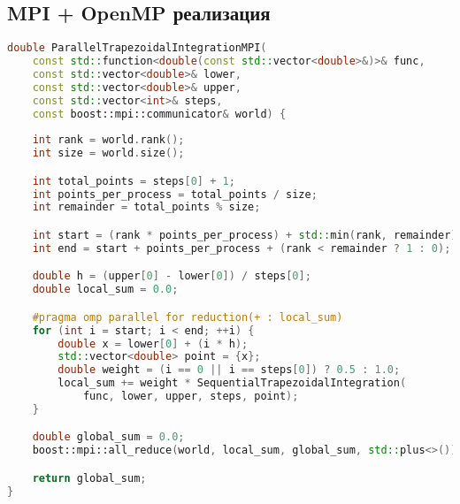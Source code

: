 \documentclass[14pt,a4paper]{extarticle}
\begin{document}
\subsection{MPI + OpenMP реализация}
\begin{lstlisting}[language=C++]
double ParallelTrapezoidalIntegrationMPI(
    const std::function<double(const std::vector<double>&)>& func,
    const std::vector<double>& lower,
    const std::vector<double>& upper,
    const std::vector<int>& steps,
    const boost::mpi::communicator& world) {
    
    int rank = world.rank();
    int size = world.size();

    int total_points = steps[0] + 1;
    int points_per_process = total_points / size;
    int remainder = total_points % size;

    int start = (rank * points_per_process) + std::min(rank, remainder);
    int end = start + points_per_process + (rank < remainder ? 1 : 0);

    double h = (upper[0] - lower[0]) / steps[0];
    double local_sum = 0.0;

    #pragma omp parallel for reduction(+ : local_sum)
    for (int i = start; i < end; ++i) {
        double x = lower[0] + (i * h);
        std::vector<double> point = {x};
        double weight = (i == 0 || i == steps[0]) ? 0.5 : 1.0;
        local_sum += weight * SequentialTrapezoidalIntegration(
            func, lower, upper, steps, point);
    }

    double global_sum = 0.0;
    boost::mpi::all_reduce(world, local_sum, global_sum, std::plus<>());

    return global_sum;
}
\end{lstlisting}
\end{document}
